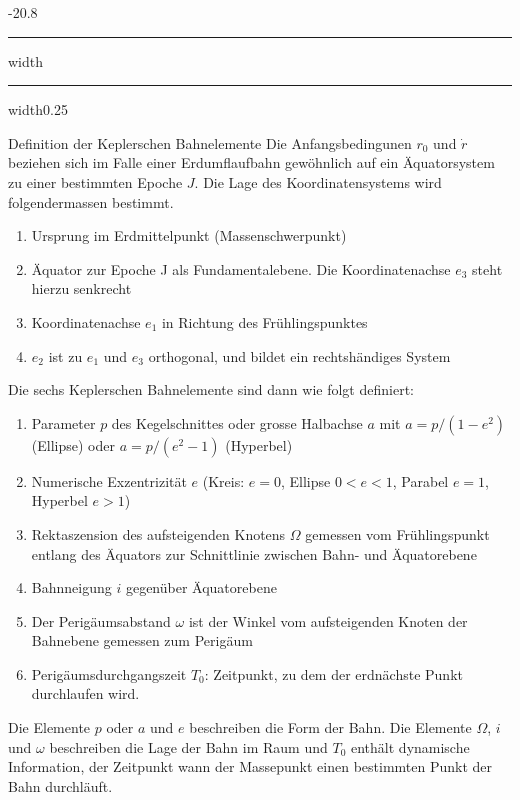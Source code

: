 \documentclass[9pt, landscape, fleqn]{scrartcl}
\makeatletter
\renewcommand{\subsection}{\@startsection{subsection}{1}{0mm}%
{-2\baselineskip}{0.8\baselineskip}%
{\hrule depth 0.2pt width\columnwidth\hrule depth0.75pt
width0.25\columnwidth\vspace*{1.2em}\large\bfseries\rmfamily}}
\makeatother
\begin{document}
\begin{multicols*}{3}
\subsection{Definition der Keplerschen Bahnelemente}
Die Anfangsbedingunen $r_0$ und $\dot{r}$ beziehen sich im Falle einer Erdumflaufbahn gewöhnlich auf ein Äquatorsystem zu einer bestimmten Epoche $J$. Die Lage des Koordinatensystems wird folgendermassen bestimmt.
\begin{enumerate}
    \item Ursprung im Erdmittelpunkt (Massenschwerpunkt)
    \item Äquator zur Epoche J als Fundamentalebene. Die Koordinatenachse $e_3$ steht hierzu senkrecht
    \item Koordinatenachse $e_1$ in Richtung des Frühlingspunktes
    \item $e_2$ ist zu $e_1$ und $e_3$ orthogonal, und bildet ein rechtshändiges System
\end{enumerate}
Die sechs Keplerschen Bahnelemente sind dann wie folgt definiert:
\begin{enumerate}
    \item Parameter $p$ des Kegelschnittes oder grosse Halbachse $a$ mit $a = p/(1-e^2)$ (Ellipse) oder $a = p/(e^2-1)$ (Hyperbel)
    \item Numerische Exzentrizität $e$ (Kreis: $e=0$, Ellipse $0 < e < 1$, Parabel $e=1$, Hyperbel $e>1$) 
    \item Rektaszension des aufsteigenden Knotens $\Omega$ gemessen vom Frühlingspunkt entlang des Äquators zur Schnittlinie zwischen Bahn- und Äquatorebene
    \item Bahnneigung $i$ gegenüber Äquatorebene
    \item Der Perigäumsabstand $\omega$ ist der Winkel vom aufsteigenden Knoten der Bahnebene gemessen zum Perigäum
    \item Perigäumsdurchgangszeit $T_0$: Zeitpunkt, zu dem der erdnächste Punkt durchlaufen wird.
\end{enumerate}
Die Elemente $p$ oder $a$ und $e$ beschreiben die Form der Bahn. Die Elemente $\Omega$, $i$ und $\omega$ beschreiben die Lage der Bahn im Raum und $T_0$ enthält dynamische Information, der Zeitpunkt wann der Massepunkt einen bestimmten Punkt der Bahn durchläuft.

\end{multicols*}
\end{document}
